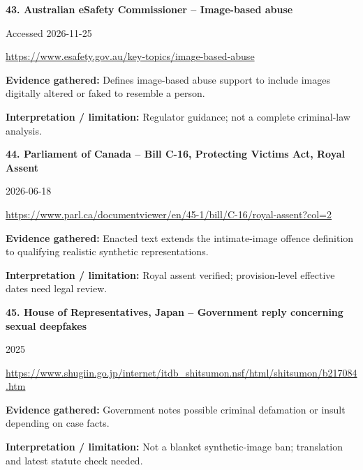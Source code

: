 \documentclass[11pt,a4paper]{article}
\begin{document}
\noindent\begin{minipage}{\linewidth}\textbf{43. Australian eSafety Commissioner -- Image-based abuse}\par{\small Accessed 2026-11-25\par\url{https://www.esafety.gov.au/key-topics/image-based-abuse}}\par
\textbf{Evidence gathered:} Defines image-based abuse support to include images digitally altered or faked to resemble a person.\par\textbf{Interpretation / limitation:} Regulator guidance; not a complete criminal-law analysis.\par
\end{minipage}\par\vspace{2mm}
\noindent\begin{minipage}{\linewidth}\textbf{44. Parliament of Canada -- Bill C-16, Protecting Victims Act, Royal Assent}\par{\small 2026-06-18\par\url{https://www.parl.ca/documentviewer/en/45-1/bill/C-16/royal-assent?col=2}}\par
\textbf{Evidence gathered:} Enacted text extends the intimate-image offence definition to qualifying realistic synthetic representations.\par\textbf{Interpretation / limitation:} Royal assent verified; provision-level effective dates need legal review.\par
\end{minipage}\par\vspace{2mm}
\noindent\begin{minipage}{\linewidth}\textbf{45. House of Representatives, Japan -- Government reply concerning sexual deepfakes}\par{\small 2025\par\url{https://www.shugiin.go.jp/internet/itdb_shitsumon.nsf/html/shitsumon/b217084.htm}}\par
\textbf{Evidence gathered:} Government notes possible criminal defamation or insult depending on case facts.\par\textbf{Interpretation / limitation:} Not a blanket synthetic-image ban; translation and latest statute check needed.\par
\end{minipage}\par\vspace{2mm}
\end{document}
